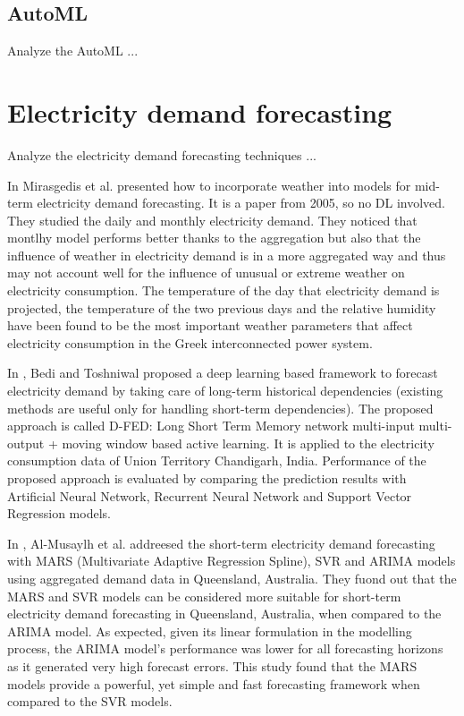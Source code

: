 \subsection{AutoML}
\label{sec:automl}
\vspace{0.1 cm}

Analyze the AutoML ...
\cite{HE2021106622}
\cite{Gijsbers2019}
\cite{Feurer2020}
\cite{Zimmer2020}
\cite{Deng2022}
\cite{su142215292}
\cite{Karmaker2021}
\cite{Chen2021}
\cite{computers10010011}
\cite{Elshawi2019}
\cite{Feurer2015}
\cite{9534091}
\cite{9579526}
\cite{9660073}
\cite{8955514}
\cite{8995391}
\cite{9033810}
\cite{9564380}


\section{Electricity demand forecasting}
\label{sec:demandsoa}
\vspace{0.2 cm}

Analyze the electricity demand forecasting techniques ...

In \cite{MIRASGEDIS2006208} Mirasgedis et al. presented how to incorporate weather into models for mid-term electricity demand forecasting.
It is a paper from 2005, so no DL involved.
They studied the daily and monthly electricity demand.
They noticed that montlhy model performs better thanks to the aggregation but also that the influence of weather in electricity demand is in a more aggregated way and thus may not account well for the influence of unusual or extreme weather on electricity consumption.
The temperature of the day that electricity demand is projected, the temperature of the two previous days and the relative humidity have been found to be the most important weather parameters that affect electricity consumption in the Greek interconnected power system.

In \cite{BEDI20191312}, Bedi and Toshniwal proposed a deep learning based framework to forecast electricity demand by taking care of long-term historical dependencies (existing methods are useful only for handling short-term dependencies).
The proposed approach is called D-FED: Long Short Term Memory network multi-input multi-output + moving window based active learning.
It is applied to the electricity consumption data of Union Territory Chandigarh, India.
Performance of the proposed approach is evaluated by comparing the prediction results with Artificial Neural Network, Recurrent Neural Network and Support Vector Regression models.

In \cite{ALMUSAYLH20181}, Al-Musaylh et al. addreesed the short-term electricity demand forecasting with MARS (Multivariate Adaptive Regression Spline), SVR and ARIMA models using aggregated demand data in Queensland, Australia.
They fuond out that the MARS and SVR models can be considered more suitable for short-term electricity demand forecasting in Queensland, Australia, when compared to the ARIMA model.
As expected, given its linear formulation in the modelling process, the ARIMA model’s performance was lower for all forecasting horizons as it generated very high forecast errors.
This study found that the MARS models provide a powerful, yet simple and fast forecasting framework when compared to the SVR models.

